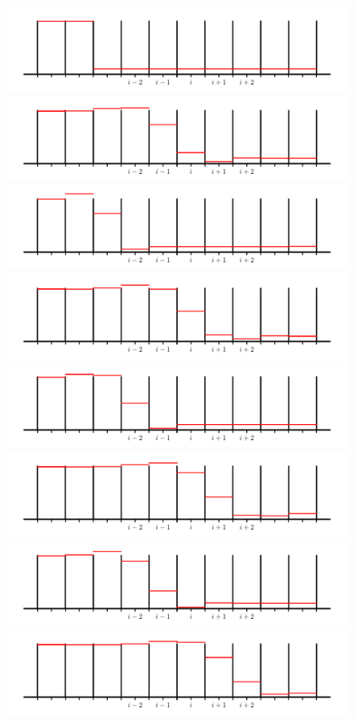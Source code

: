 \begin{figure}[p!]
\centering
\includegraphics[width=0.495\linewidth]{rea-nolimit-start_001}\hspace{0.02em}
\includegraphics[width=0.495\linewidth]{rea-nolimit-start_005} \\
\includegraphics[width=0.495\linewidth]{rea-nolimit-start_002}\hspace{0.02em}
\includegraphics[width=0.495\linewidth]{rea-nolimit-start_006} \\
\includegraphics[width=0.495\linewidth]{rea-nolimit-start_003}\hspace{0.02em}
\includegraphics[width=0.495\linewidth]{rea-nolimit-start_007} \\
\includegraphics[width=0.495\linewidth]{rea-nolimit-start_004}\hspace{0.02em}
\includegraphics[width=0.495\linewidth]{rea-nolimit-start_008} \\

\end{figure}
